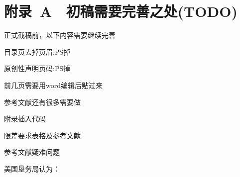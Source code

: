﻿%

\chapter*{\hfill 附录~A　初稿需要完善之处(TODO) \hfill}

正式截稿前，以下内容需要继续完善

\begin{asparaenum}
\item 目录页去掉页眉:PS掉
\item 原创性声明页码:PS掉
\item 前几页需要用word编辑后贴过来
\item 参考文献还有很多需要做
\item 附录插入代码
\item 限差要求表格及参考文献
\end{asparaenum}

参考文献疑难问题
\begin{asparaenum}
\item 美国垦务局认为：
\item
\end{asparaenum}
